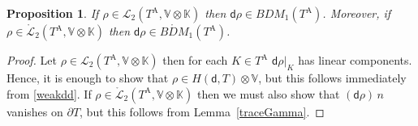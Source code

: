 \documentclass[12pt]{amsart}
\numberwithin{equation}{section}
\newtheorem{proposition}[theorem]{Proposition}
\theoremstyle{definition}
\theoremstyle{remark}
\newcommand{\V}{\mathbb{V}}
\newcommand{\K}{\mathbb{K}}
\renewcommand{\(}{\bigl(}
\renewcommand{\)}{\bigr)}
\newcommand{\dd}{\mathsf{d}}
\newcommand{\BDM}{{B\!D\!M}}
\newcommand{\BDMo}{\mathring{\BDM}}
\newcommand{\pol}{\EuScript{P}}
\newcommand{\Ta}{T^{\text{A}}}
\newcommand{\Th}{\mathcal{T}_h}
\newcommand{\LL}{\mathcal{L}}
\newcommand{\LLo}{\mathring{\mathcal{L}}}
\begin{document}
\begin{proposition}\label{ddBDM}
If  $\rho \in \LL_2(\Ta,  \V \otimes \K)$ then $\dd \rho \in  \BDM_1(\Ta)$. Moreover,  if $\rho \in \LLo_2(\Ta, \V \otimes  \K)$ then $\dd \rho \in  \BDMo_1(\Ta)$. 
\end{proposition}
\begin{proof}
Let $\rho \in  \LL_2(\Ta,  \V \otimes \K)$ then for  each $K \in \Ta$  $\dd \rho|_K$ has linear components. Hence, it is enough to show that $\rho \in H(\dd, T) \otimes \V$, but this follows immediately from \eqref{weakdd}.  If  $\rho \in \LLo_2(\Ta,  \V \otimes \K)$ then we must also show that $(\dd \rho) \, n$ vanishes on $\partial T$, but this follows from Lemma~\ref{traceGamma}. 
\end{proof}



\end{document}
